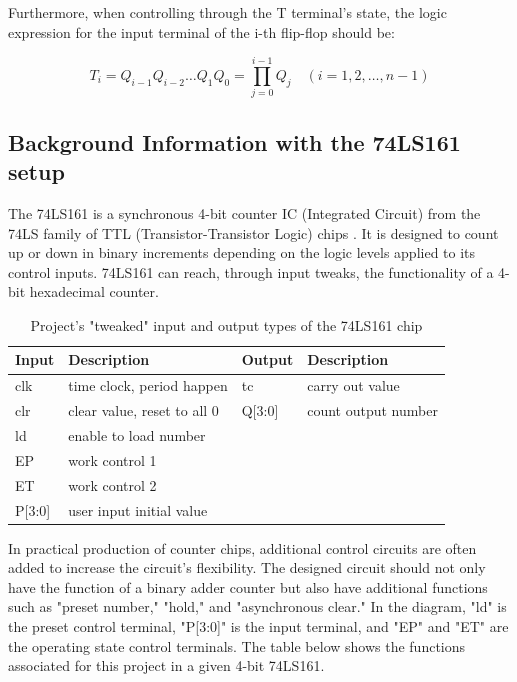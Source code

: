 \documentclass[conference]{IEEEtran}
\begin{document}
Furthermore, when controlling through the T terminal's state, the logic expression for the input terminal of the i-th flip-flop should be:

\begin{equation}
    T_i = Q_{i-1} Q_{i-2} … Q_1 Q_0 = \prod_{j=0}^{i-1} Q_j \quad (i=1, 2, …, n-1)
\end{equation}

\subsection{Background Information with the 74LS161 setup}
The 74LS161 is a synchronous 4-bit counter IC (Integrated Circuit) from the 74LS family of TTL (Transistor-Transistor Logic) chips \cite{Jung2003}. It is designed to count up or down in binary increments depending on the logic levels applied to its control inputs. 74LS161 can reach, through input tweaks, the functionality of a 4-bit hexadecimal counter.

\begin{table}[h]
    \centering
    \caption{Project's "tweaked" input and output types of the 74LS161 chip}
\begin{tabular}{|>{\centering\arraybackslash}m{0.75cm}|>{\centering\arraybackslash}m{3cm}|>{\centering\arraybackslash}m{1cm}|>{\centering\arraybackslash}m{2.5cm}|}
\hline
\textbf{Input} & \textbf{Description} & \textbf{Output} & \textbf{Description} \\ \hline 
clk & time clock, period happen & tc & carry out value \\ 
clr & clear value, reset to all 0 & Q[3:0] & count output number \\ 
ld & enable to load number &  &  \\ 
EP & work control 1 &  &  \\ 
ET & work control 2 &  &  \\ 
P[3:0] & user input initial value &  &  \\ \hline
\end{tabular}
\end{table}

In practical production of counter chips, additional control circuits are often added to increase the circuit's flexibility. The designed circuit should not only have the function of a binary adder counter but also have additional functions such as "preset number," "hold," and "asynchronous clear." In the diagram, "ld" is the preset control terminal, "P[3:0]" is the input terminal, and "EP" and "ET" are the operating state control terminals. The table below shows the functions associated for this project in a given 4-bit 74LS161.
\end{document}
